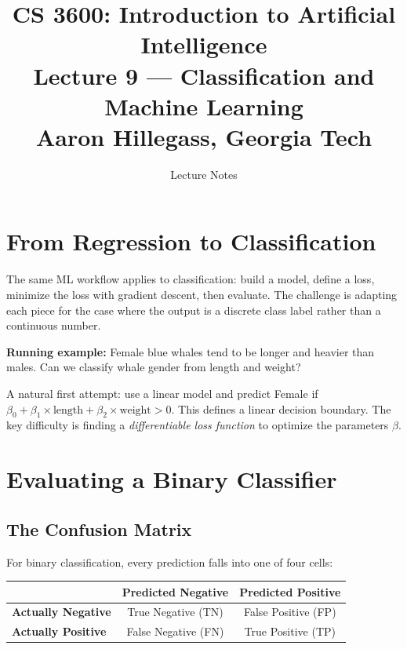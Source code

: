 \documentclass[12pt]{article}
\title{
  \textbf{CS 3600: Introduction to Artificial Intelligence}\\[0.5em]
  \large Lecture 9 --- Classification and Machine Learning\\[0.3em]
  \normalsize Aaron Hillegass, Georgia Tech
}
\author{Lecture Notes}
\date{}
\begin{document}
\maketitle
\tableofcontents
\newpage

\section{From Regression to Classification}

The same ML workflow applies to classification: build a model, define a loss, minimize the loss with gradient descent, then evaluate. The challenge is adapting each piece for the case where the output is a discrete class label rather than a continuous number.

\textbf{Running example:} Female blue whales tend to be longer and heavier than males. Can we classify whale gender from length and weight?

A natural first attempt: use a linear model and predict Female if $\beta_0 + \beta_1 \times \text{length} + \beta_2 \times \text{weight} > 0$. This defines a linear decision boundary. The key difficulty is finding a \emph{differentiable loss function} to optimize the parameters $\beta$.

\section{Evaluating a Binary Classifier}

\subsection{The Confusion Matrix}

For binary classification, every prediction falls into one of four cells:

\begin{center}
\begin{tabular}{l|cc}
 & \textbf{Predicted Negative} & \textbf{Predicted Positive} \\\hline
\textbf{Actually Negative} & True Negative (TN) & False Positive (FP) \\
\textbf{Actually Positive} & False Negative (FN) & True Positive (TP) \\
\end{tabular}
\end{center}
\end{document}

